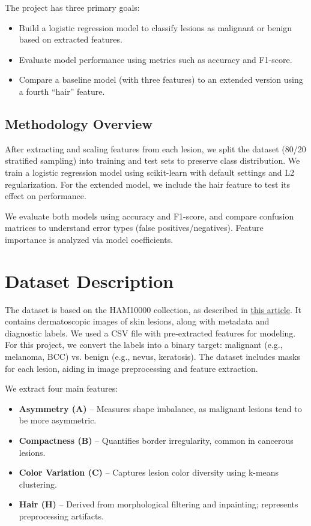 \documentclass[10pt,twocolumn]{article}
\begin{document}
The project has three primary goals:
\begin{itemize}
    \item Build a logistic regression model to classify lesions as malignant or benign based on extracted features.
    \item Evaluate model performance using metrics such as accuracy and F1-score.
    \item Compare a baseline model (with three features) to an extended version using a fourth “hair” feature.
\end{itemize}

\subsection*{Methodology Overview}

After extracting and scaling features from each lesion, we split the dataset (80/20 stratified sampling) into training and test sets to preserve class distribution. We train a logistic regression model using scikit-learn with default settings and L2 regularization. For the extended model, we include the hair feature to test its effect on performance.

We evaluate both models using accuracy and F1-score, and compare confusion matrices to understand error types (false positives/negatives). Feature importance is analyzed via model coefficients.

\section{Dataset Description}
The dataset is based on the HAM10000 collection, as described in \href{https://www.sciencedirect.com/science/article/pii/S235234092031115X}{this article}. It contains dermatoscopic images of skin lesions, along with metadata and diagnostic labels. We used a CSV file with pre-extracted features for modeling. For this project, we convert the labels into a binary target: malignant (e.g., melanoma, BCC) vs. benign (e.g., nevus, keratosis). The dataset includes masks for each lesion, aiding in image preprocessing and feature extraction.

We extract four main features:
\begin{itemize}
    \item \textbf{Asymmetry (A)} – Measures shape imbalance, as malignant lesions tend to be more asymmetric.
    \item \textbf{Compactness (B)} – Quantifies border irregularity, common in cancerous lesions.
    \item \textbf{Color Variation (C)} – Captures lesion color diversity using k-means clustering.
    \item \textbf{Hair (H)} – Derived from morphological filtering and inpainting; represents preprocessing artifacts.
\end{itemize}
\end{document}
